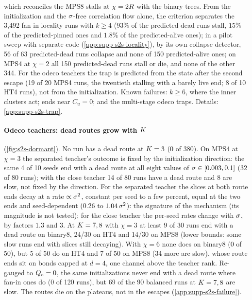 which reconciles the MPS8 stalls at $\chi=2R$ with the binary trees. \empirical{} From the initialization and the
$\sigma$-free correlation flow alone, the criterion separates the 3,492 fan-in locality runs with $k\ge4$ ($93\%$ of the
predicted-dead runs stall, $15\%$ of the predicted-pinned ones and $1.8\%$ of the predicted-alive ones); in a pilot sweep with separate code (\cref{app:supp-s2s-locality}), by
its own collapse detector, 56 of 63 predicted-dead runs collapse and none of 150 predicted-alive ones; on MPS4 at $\chi=2$ all 150
predicted-dead runs stall or die, and none of the other 344. For the odeco teachers the trap is predicted from the
state after the second escape (19 of 20 MPS4 runs, the twentieth stalling with a barely live end; 8 of 10 HT4
runs), not from the initialization. Known failures: $k\ge6$, where the inner clusters act; ends near $C_u=0$; and
the multi-stage odeco traps. Details: \cref{app:supp-s2s-trap}.  

\paragraph{Odeco teachers: dead routes grow with $K$} (\cref{fig:s2s-dormant}).
\empirical{} No run has a dead route at $K=3$ (0 of 380). On MPS4 at $\chi=3$ the separated teacher's outcome is
fixed by the initialization direction: the same 4 of 10 seeds end with a dead route at all eight values of
$\sigma\in[0.003,0.1]$ (32 of 80 runs); with the close teacher 14 of 80 runs have a dead route and 8 are slow, not
fixed by the direction. For the separated teacher the slices at both route ends decay at a rate $\propto\sigma^2$,
constant per seed to a few percent, equal at the two ends and seed-dependent ($0.26$ to $1.04\,\sigma^2$): the
signature of the mechanism (its magnitude is not tested); for the close teacher the per-seed rates change with
$\sigma$, by factors $1.3$ and $3$. At $K=7,8$ with $\chi=3$ at least 9 of 30 runs end with a dead route on binary8,
24/30 on HT4 and 14/30 on MPS8 (lower bounds: some slow runs end with slices still decaying). With $\chi=6$ none
does on binary8 (0 of 50), but 5 of 50 do on HT4 and 7 of 50 on MPS8 (34 more are slow), whose route ends sit on
bonds capped at $d=4$, one channel above the teacher rank. Re-gauged to $Q_{e}=0$, the same initializations never
end with a dead route where fan-in ones do (0 of 120 runs), but 69 of the 90 balanced runs at $K=7,8$ are slow.
The routes die on the plateaus, not in the escapes (\cref{app:supp-s2s-failure}). \newresult


